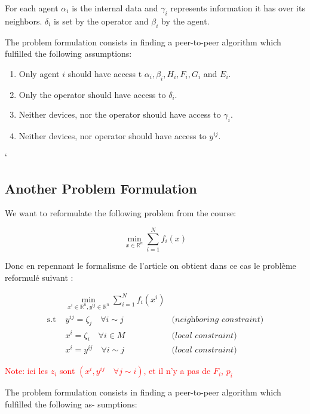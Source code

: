 \documentclass[10pt,english]{article}
\begin{document}
For each agent $\alpha_i$ is the internal data and $\gamma_i$ represents information
it has over its neighbors. $\delta_i$ is set by the operator and $\beta_i$ by the agent.

The problem formulation consists in finding a peer-to-peer algorithm which fulfilled the following
assumptions:
\begin{enumerate}
    \item Only agent $i$ should have access t $\alpha_i,\beta_i,H_i, F_i, G_i$ and $E_i$.
    \item Only the operator should have access to $\delta_i$.
    \item Neither devices, nor the operator should have access to $\gamma_i$.
    \item Neither devices, nor operator should have access to $y^{ij}$.
\end{enumerate}

`\subsection{Another Problem Formulation}

We want to reformulate the following problem from the course: 

\begin{equation*}
    \min_{x\in \mathbb R^n} \sum_{i=1}^N f_i(x)
\end{equation*}

Donc en repennant le formalisme de l'article on obtient dans ce cas le problème reformulé suivant :

\begin{equation*}
    \begin{aligned}
    &\min_{x^i\in\mathbb{R}^{n}, y^{ij}\in\mathbb{R}^{n}} \sum_{i=1}^{N} f_i(x^i)\\
    \text{s.t } & y^{ij}=\zeta_{j} \quad \forall i\sim j & \textit{(neighboring constraint)}\\ 
    & x^i=\zeta_i \quad \forall i \in M & \textit{(local constraint)}\\
    & x^i=y^{ij} \quad \forall i\sim j & \textit{(local constraint)}
    \end{aligned}
\end{equation*}

\textcolor{red}{Note: ici les $z_i$ sont $(x^i, y^{ij} \quad \forall j \sim i)$, et il n'y a pas de     $F_i$, $p_i$}

The problem formulation consists in finding a peer-to-peer algorithm which fulfilled the following as-
sumptions:
\end{document}
